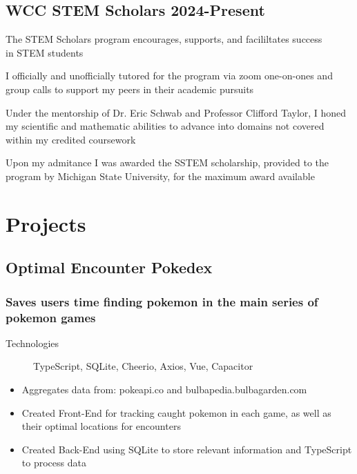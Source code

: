 \documentclass[10pt]{article} %
\begin{document}
\subsection{WCC STEM Scholars \hfill 2024-Present}
\begin{description}[style=multiline, leftmargin=2.75cm]
    \item[Program Details]{The STEM Scholars program encourages,
        supports, and facililtates success \\ in STEM students}
    \item[Tutoring]{I officially and unofficially 
        tutored for the program via zoom one-on-ones and group calls to support 
        my peers in their academic pursuits}
    \item[Mentoring]{Under the mentorship of Dr. Eric Schwab and Professor Clifford
        Taylor, I honed my scientific and mathematic abilities to advance into 
        domains not covered within my credited coursework}
    \item[Scholarship]{Upon my admitance I was awarded the SSTEM scholarship, 
        provided to the program by Michigan State University, for the maximum
        award available} 
\end{description}

\section{Projects}
\subsection{Optimal Encounter Pokedex}
\subsubsection{Saves users time finding pokemon in the main series of pokemon games}
\begin{description}
    \item[Technologies] {TypeScript, SQLite, Cheerio, Axios, Vue, Capacitor}
\end{description}
\begin{itemize}
    \item {Aggregates data from: pokeapi.co and bulbapedia.bulbagarden.com}
    \item {Created Front-End for tracking caught pokemon in each game, 
        as well as their optimal locations for encounters}
    \item {Created Back-End using SQLite to store relevant information and TypeScript
        to process data}
\end{itemize}
\end{document}
